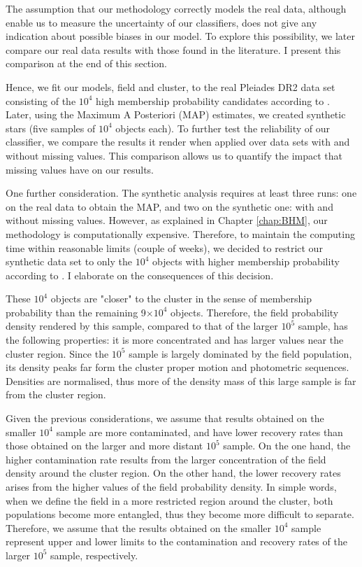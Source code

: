 The assumption that our methodology correctly models the real data, although enable us to measure the uncertainty of our classifiers, does not give any indication about possible biases in our model. To explore this possibility, we later compare our real data results with those found in the literature. I present this comparison at the end of this section.

Hence, we fit our models, field and cluster, to the real Pleiades DR2 data set consisting of the $10^4$ high membership probability candidates according to \citet{Bouy2015}. Later, using the Maximum A Posteriori (MAP) estimates, we created synthetic stars (five samples of $10^4$ objects each). To further test the reliability of our classifier, we compare the results it render when applied over data sets with and without missing values. This comparison allows us to quantify the impact that missing values have on our results.    

One further consideration. The synthetic analysis requires at least three runs: one on the real data to obtain the MAP, and two on the synthetic one: with and without missing values. However, as explained in Chapter \ref{chap:BHM}, our methodology is computationally expensive. Therefore, to maintain the computing time within reasonable limits (couple of weeks), we decided to restrict our synthetic data set to only the $10^4$ objects with higher membership probability according to \citet{Bouy2015}. I elaborate on the consequences of this decision.

These $10^4$ objects are "closer" to the cluster in the sense of membership probability than the remaining 9$\times 10^4$ objects. Therefore, the field probability density rendered by this sample, compared to that of the larger $10^5$ sample, has the following properties: it is more concentrated and has larger values near the cluster region. Since the $10^5$ sample is largely dominated by the field population, its density peaks far form the cluster proper motion and photometric sequences. Densities are normalised, thus more of the density mass of this large sample is far from the cluster region. 

Given the previous considerations, we assume that results obtained on the smaller $10^4$ sample are more contaminated, and have lower recovery rates than those obtained on the larger and more distant $10^5$ sample. On the one hand, the higher contamination rate results from the larger concentration of the field density around the cluster region.  On the other hand, the lower recovery rates arises from the higher values of the field probability density. In simple words, when we define the field in a more restricted region around the cluster, both populations become more entangled, thus they become more difficult to separate. Therefore, we assume that the results obtained on the smaller $10^4$ sample represent upper and lower limits to the contamination and recovery rates of the larger $10^5$ sample, respectively.

